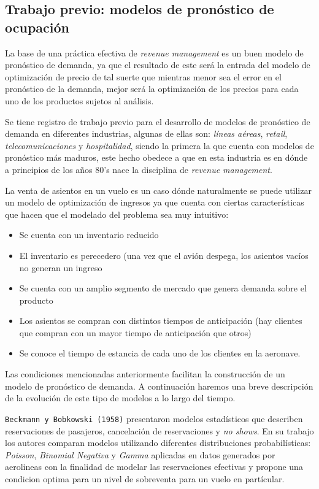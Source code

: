 {\subsection*{Trabajo previo: modelos de pronóstico de ocupación}

La base de una práctica efectiva de \emph{revenue management} es un buen modelo de pronóstico de demanda, ya que el resultado de este será la entrada del modelo de optimización de precio de tal suerte que mientras menor sea el error en el pronóstico de la demanda, mejor será la optimización de los precios para cada uno de los productos sujetos al análisis.

Se tiene registro de trabajo previo para el desarrollo de modelos de pronóstico de demanda en diferentes industrias, algunas de ellas son: \emph{líneas aéreas}, \emph{retail}, \emph{telecomunicaciones} y \emph{hospitalidad}, siendo la primera la que cuenta con modelos de pronóstico más maduros, este hecho obedece a que en esta industria es en dónde a principios de los años 80's nace la disciplina de \emph{revenue management}. 

La venta de asientos en un vuelo es un caso dónde naturalmente se puede utilizar un modelo de optimización de ingresos ya que cuenta con ciertas características que hacen que el modelado del problema sea muy intuitivo:
\begin{itemize}
  \item Se cuenta con un inventario reducido
  \item El inventario es perecedero (una vez que el avión despega, los asientos vacíos no generan un ingreso
  \item Se cuenta con un amplio segmento de mercado que genera demanda sobre el producto
  \item Los asientos se compran con distintos tiempos de anticipación (hay clientes que compran con un mayor tiempo de anticipación que otros)
  \item Se conoce el tiempo de estancia de cada uno de los clientes en la aeronave.
\end{itemize}

Las condiciones mencionadas anteriormente facilitan la construcción de un modelo de pronóstico de demanda. A continuación haremos una breve descripción de la evolución de este tipo de modelos a lo largo del tiempo.

\texttt{Beckmann y Bobkowski (1958)} presentaron modelos estadísticos que describen reservaciones de pasajeros, cancelación de reservaciones y \emph{no shows}. En su trabajo los autores comparan modelos utilizando diferentes distribuciones probabilísticas: \emph{Poisson}, \emph{Binomial Negativa} y \emph{Gamma} aplicadas en datos generados por aerolineas con la finalidad de modelar las reservaciones efectivas y propone una condicion optima para un nivel de sobreventa para un vuelo en partícular.

}
